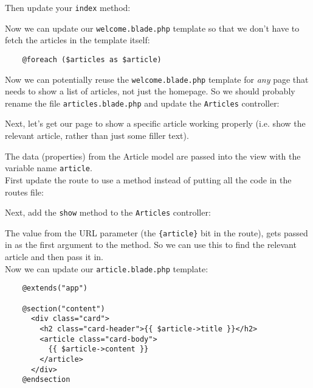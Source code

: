 
Then update your \texttt{index} method:


Now we can update our \texttt{welcome.blade.php} template so that we don't have to fetch the articles in the template itself:

\begin{verbatim}
    @foreach ($articles as $article)
\end{verbatim}

Now we can potentially reuse the \texttt{welcome.blade.php} template for \textit{any} page that needs to show a list of articles, not just the homepage. So we should probably rename the file \texttt{articles.blade.php} and update the \texttt{Articles} controller:


Next, let's get our page to show a specific article working properly (i.e. show the relevant article, rather than just some filler text).


The data (properties) from the Article model are passed into the view with the variable name \texttt{article}.
\\

First update the route to use a method instead of putting all the code in the routes file:


Next, add the \texttt{show} method to the \texttt{Articles} controller:


The value from the URL parameter (the \texttt{\{article\}} bit in the route), gets passed in as the first argument to the method. So we can use this to find the relevant article and then pass it in.
\\

Now we can update our \texttt{article.blade.php} template:

\begin{verbatim}
    @extends("app")

    @section("content")
      <div class="card">
        <h2 class="card-header">{{ $article->title }}</h2>
        <article class="card-body">
          {{ $article->content }}
        </article>
      </div>
    @endsection
\end{verbatim}

